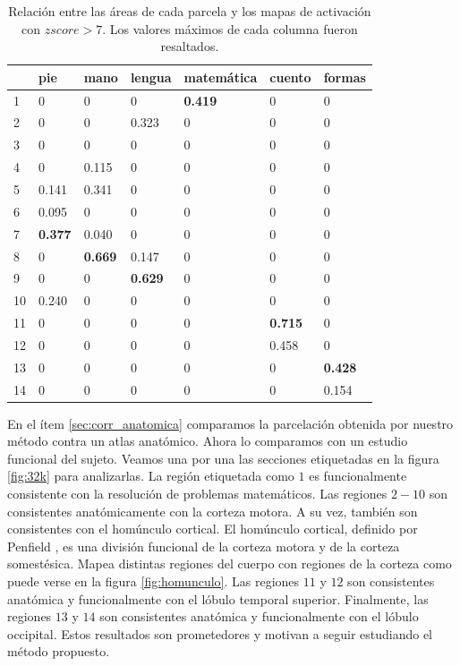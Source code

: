 \begin{table}[]
\centering

\begin{tabular}{|l|l|l|l|l|l|l|}
\hline
   & pie   & mano  & lengua & matem\'atica & cuento & formas \\ \hline
1  & 0     & 0     & 0      & {\bf 0.419} & 0     & 0      \\ \hline
2  & 0     & 0     & 0.323  & 0          & 0      & 0      \\ \hline
3  & 0     & 0     & 0      & 0          & 0      & 0      \\ \hline
4  & 0     & 0.115 & 0      & 0          & 0      & 0      \\ \hline
5  & 0.141 & 0.341 & 0      & 0          & 0      & 0      \\ \hline
6  & 0.095 & 0     & 0      & 0          & 0      & 0      \\ \hline
7  & {\bf 0.377} & 0.040 & 0      & 0          & 0      & 0      \\ \hline
8  & 0     & {\bf 0.669} & 0.147  & 0          & 0      & 0      \\ \hline
9  & 0     & 0     & {\bf 0.629}  & 0          & 0      & 0      \\ \hline
10 & 0.240 & 0     & 0      & 0          & 0      & 0      \\ \hline
11 & 0     & 0     & 0      & 0          & {\bf 0.715}  & 0      \\ \hline
12 & 0     & 0     & 0      & 0          & 0.458  & 0      \\ \hline
13 & 0     & 0     & 0      & 0          & 0      & {\bf 0.428}  \\ \hline
14 & 0     & 0     & 0      & 0          & 0      & 0.154 \\ \hline
\end{tabular}
\caption{Relaci\'on entre las \'areas de cada parcela y los mapas de
         activaci\'on con $zscore > 7$. Los valores m\'aximos de cada 
         columna fueron resaltados.}
\label{tb:zscore7}         
\end{table}

En el \'item \ref{sec:corr_anatomica} comparamos la parcelaci\'on obtenida
por nuestro m\'etodo contra un atlas anat\'omico. Ahora lo comparamos con
un estudio funcional del sujeto. Veamos una por una las secciones
etiquetadas en la figura \ref{fig:32k} para analizarlas. La regi\'on
etiquetada como $1$ es funcionalmente consistente
con la resoluci\'on de problemas matem\'aticos. Las regiones $2-10$ son
consistentes anat\'omicamente con la corteza motora. A su vez, tambi\'en
son consistentes con el hom\'unculo cortical. El hom\'unculo cortical,
definido por Penfield \cite{Penfield1954}, es una divisi\'on funcional de
la corteza motora y de la corteza somest\'esica. Mapea distintas 
regiones del cuerpo con regiones de la corteza como puede verse en la
figura \ref{fig:homunculo}. Las regiones $11$ y $12$ son consistentes 
anat\'omica y funcionalmente con el l\'obulo temporal superior.
Finalmente, las regiones $13$ y $14$ son consistentes anat\'omica y
funcionalmente con el l\'obulo occipital. Estos resultados son prometedores
y motivan a seguir estudiando el m\'etodo propuesto.

